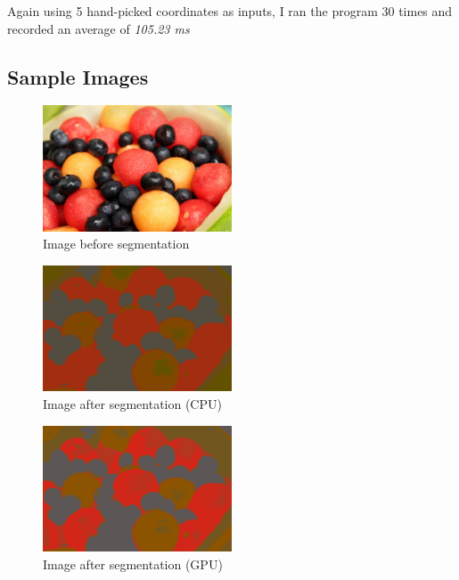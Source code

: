 \documentclass[11pt]{article}
\begin{document}
Again using 5 hand-picked coordinates as inputs, I ran the program 30 times and recorded an
average of \emph{105.23 ms}

\subsection{Sample Images}

\begin{figure}[ht]
    \centering
    \includegraphics[width=0.5\textwidth]{fruit.png}
    \caption{Image\cite{fruit} before segmentation}
    \label{fig:fruit}
\end{figure}

\begin{figure}[ht]
    \centering
    \includegraphics[width=0.5\textwidth]{fruit-segmented-cpu.png}
    \caption{Image after segmentation (CPU)}
    \label{fig:fruit-segmented-cpu}
\end{figure}

\begin{figure}[ht]
    \centering
    \includegraphics[width=0.5\textwidth]{fruit-segmented-gpu.png}
    \caption{Image after segmentation (GPU)}
    \label{fig:fruit-segmented-gpu}
\end{figure}
\end{document}
